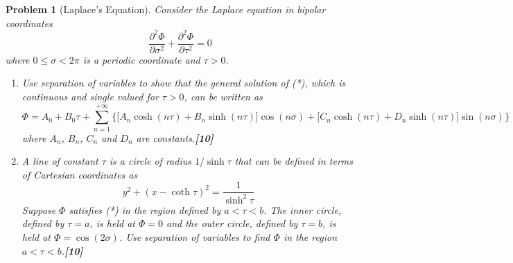 \documentclass[a4paper]{article}
\theoremstyle{new}
\newtheorem{qns}{Problem}[section]
\begin{document}
\begin{qns}[Laplace's Equation]
Consider the Laplace equation in bipolar coordinates
\begin{equation}
    \frac{\partial^2\Phi}{\partial\sigma^2}+\frac{\partial^2\Phi}{\partial\tau^2}=0\tag{*}
\end{equation}
where $0\leq\sigma < 2\pi$ is a periodic coordinate and $\tau>0$.
\begin{enumerate}[label=(\alph*)]
\item Use separation of variables to show that the general solution of (*), which is continuous and single valued for $\tau>0$, can be written as 
$$\Phi=A_0+B_0\tau+\sum_{n=1}^{+\infty}\bigg\{\bigg[A_n\cosh(n\tau)+B_n\sinh(n\tau)\bigg]\cos(n\sigma)+\bigg[C_n\cosh(n\tau)+D_n\sinh(n\tau)\bigg]\sin(n\sigma)\bigg\}$$
where $A_n$, $B_n$, $C_n$ and $D_n$ are constants.\hfill\textbf{[10]}
\item A line of constant $\tau$ is a circle of radius $1/\sinh\tau$ that can be defined in terms of Cartesian coordinates as
$$y^2+(x-\coth\tau)^2=\frac{1}{\sinh^2\tau}$$
Suppose $\Phi$ satisfies (*) in the region defined by $a<\tau<b$. The inner circle, defined by $\tau= a$, is held at $\Phi=0$ and the outer circle, defined by $\tau=b$, is held at $\Phi=\cos(2\sigma)$. Use separation of variables to find $\Phi$ in the region $a<\tau<b$.\hfill\textbf{[10]}
\end{enumerate}
\end{qns}
\end{document}
